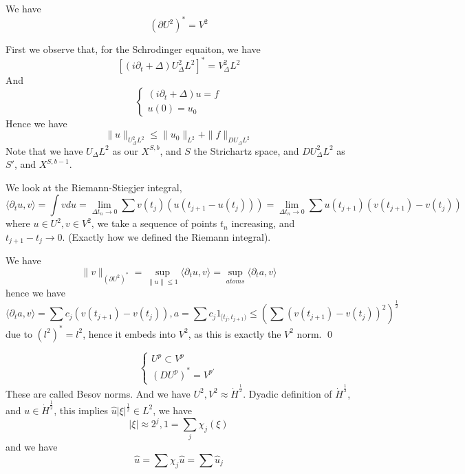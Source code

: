 \begin{proposition}
    We have
    \begin{equation*}
        (\partial U^2)^*=V^2
    \end{equation*}
\end{proposition}
First we observe that, for the Schrodinger equaiton, we have
\begin{equation*}
    \left[(i\partial_t+\Delta)U_\Delta^2L^2 \right]^*=V_\Delta^2L^2
\end{equation*}
And
\begin{equation*}
    \begin{cases}
        (i\partial_t+\Delta)u=f\\
        u(0)=u_0
    \end{cases}
\end{equation*}
Hence we have
\begin{equation*}
    \|u\|_{U_\Delta^2L^2}\leq\|u_0\|_{L^2}+\|f\|_{DU_\Delta L^2}
\end{equation*}
Note that we have $U_\Delta L^2$ as our $X^{S,b}$, and $S$ the Strichartz space, and $DU_\Delta^2L^2$ as $S'$, and $X^{S,b-1}$.

We look at the Riemann-Stiegjer integral, 
\begin{equation*}
    \langle \partial_t u, v\rangle=\int vdu=\lim_{\Delta t_n\to 0}\sum v(t_j)\left(u(t_{j+1}-u(t_j)) \right)=\lim_{\Delta t_n\to 0}\sum u(t_{j+1})(v(t_{j+1})-v(t_j))
\end{equation*}
where $u\in U^2, v\in V^2$, we take a sequence of points $t_n$ increasing, and $t_{j+1}-t_j\to 0.$ (Exactly how we defined the Riemann integral).

We have
\begin{equation*}
    \|v\|_{(\partial U^2)^*}=\sup_{\|u\|\leq 1}\langle \partial_t u, v\rangle=\sup_{atoms}\langle \partial_t a, v\rangle
\end{equation*}
hence we have
\begin{equation*}
    \langle \partial_ta, v\rangle=\sum c_j(v(t_{j+1})-v(t_j)), a=\sum c_j1_{[t_j, t_{j+1})}\leq\left(\sum(v(t_{j+1})-v(t_j))^2 \right)^\frac{1}{2}
\end{equation*}
due to $(l^2)^*=l^2$, hence it embeds into $V^2$, as this is exactly the $V^2$ norm.
\qed


\begin{equation*}
    \begin{cases}
        U^p\subset V^p\\
        (DU^p)^*=V^{p'}
    \end{cases}
\end{equation*}
These are called Besov norms.
And we have $U^2, V^2\approx \dot{H}^\frac{1}{2}$. Dyadic definition of $\dot{H}^\frac{1}{2}$, and $u\in\dot{H}^\frac{1}{2}$, this implies $\hat{u}|\xi|^\frac{1}{2}\in L^2$, we have
\begin{equation*}
    |\xi|\approx 2^j, 1=\sum_j\chi_j(\xi)
\end{equation*}
and we have
\begin{equation*}
    \hat{u}=\sum\chi_j\hat{u}=\sum\hat{u}_j
\end{equation*}

